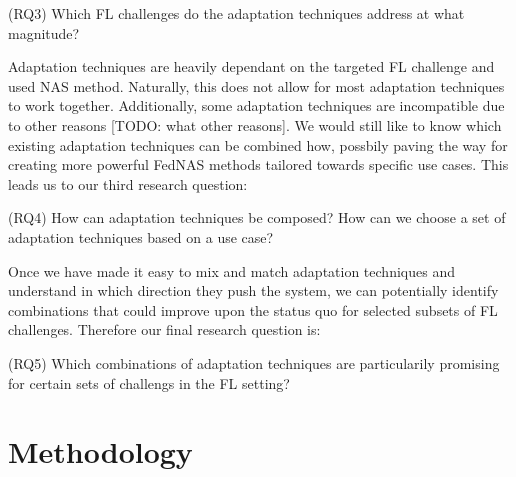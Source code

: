 \vspace{1em}
(RQ3) Which FL challenges do the adaptation techniques address at what magnitude?
\vspace{1em}

Adaptation techniques are heavily dependant on the targeted FL challenge and used NAS method. Naturally, this does not allow for most adaptation techniques to work together. Additionally, some adaptation techniques are incompatible due to other reasons [TODO: what other reasons]. We would still like to know which existing adaptation techniques can be combined how, possbily paving the way for creating more powerful FedNAS methods tailored towards specific use cases. This leads us to our third research question:

\vspace{1em}
(RQ4) How can adaptation techniques be composed? How can we choose a set of adaptation techniques based on a use case?
\vspace{1em}

Once we have made it easy to mix and match adaptation techniques and understand in which direction they push the system, we can potentially identify combinations that could improve upon the status quo for selected subsets of FL challenges. Therefore our final research question is:

\vspace{1em}
(RQ5) Which combinations of adaptation techniques are particularily promising for certain sets of challengs in the FL setting?
\vspace{1em}

\section{Methodology}


